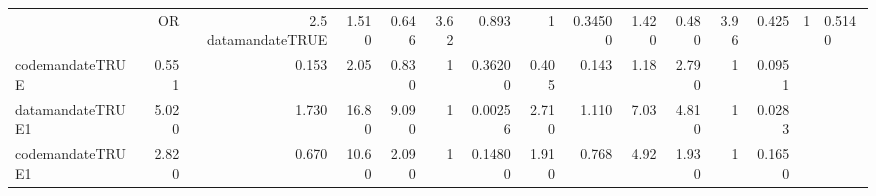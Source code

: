 \begin{table}[ht]
\centering
\begin{tabular}{lrrrrrrrrrrrr}
  \hline
 & OR & 2.5 %
  \hline
datamandateTRUE & 1.510 & 0.646 & 3.62 & 0.893 & 1 & 0.34500 & 1.420 & 0.480 & 3.96 & 0.425 & 1 & 0.5140 \\ 
  codemandateTRUE & 0.551 & 0.153 & 2.05 & 0.830 & 1 & 0.36200 & 0.405 & 0.143 & 1.18 & 2.790 & 1 & 0.0951 \\ 
  datamandateTRUE1 & 5.020 & 1.730 & 16.80 & 9.090 & 1 & 0.00256 & 2.710 & 1.110 & 7.03 & 4.810 & 1 & 0.0283 \\ 
  codemandateTRUE1 & 2.820 & 0.670 & 10.60 & 2.090 & 1 & 0.14800 & 1.910 & 0.768 & 4.92 & 1.930 & 1 & 0.1650 \\ 
   \hline
\end{tabular}
\end{table}
